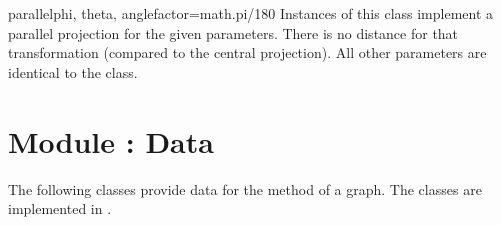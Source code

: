 \begin{classdesc}{parallel}{phi, theta, anglefactor=math.pi/180}
  Instances of this class implement a parallel projection for the
  given parameters. There is no distance for that transformation
  (compared to the central projection). All other parameters are
  identical to the  class.
\end{classdesc} %

\section{Module : Data} %
\label{graph:data}


The following classes provide data for the  method of a
graph. The classes are implemented in .

